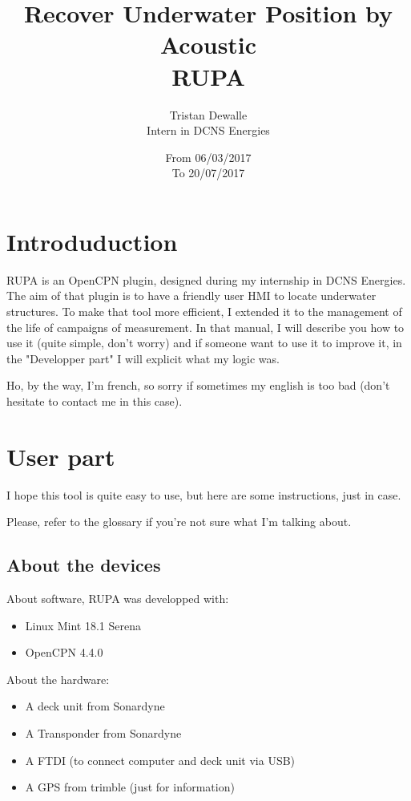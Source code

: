 \documentclass[11pt]{report}
\title{Recover Underwater Position by Acoustic \\ RUPA}
\author{Tristan Dewalle \\ Intern in DCNS Energies}
\date{From 06/03/2017\\To 20/07/2017}
\begin{document}
    \maketitle
	\tableofcontents
	\chapter{Introduduction}
	 RUPA is an OpenCPN plugin, designed during my internship in DCNS Energies. The aim of that plugin is to 
	 have a friendly user HMI to locate underwater structures. To make that tool more efficient, I extended it 
	 to the management of the life of campaigns of measurement. In that manual, I will describe you how to use it
	 (quite simple, don't worry) and if someone want to use it to improve it, in the "Developper part" I will 
	 explicit what my logic was.

	 Ho, by the way, I'm french, so sorry if sometimes my english is too bad (don't hesitate to contact me in this case).
	\chapter{User part}
	    I hope this tool is quite easy to use, but here are some instructions, just in case.

	    Please, refer to the glossary if you're not sure what I'm talking about.
	    \section{About the devices }
		About software, RUPA was developped with:
		\begin{itemize}
		    \item Linux Mint 18.1 Serena
		    \item OpenCPN 4.4.0
		\end{itemize}

		 About the hardware: 
		\begin{itemize}
		    \item A deck unit from Sonardyne
		    \item A Transponder from Sonardyne
		    \item A FTDI (to connect computer and deck unit via USB)
		    \item A GPS from trimble (just for information)
		\end{itemize}
\end{document}
